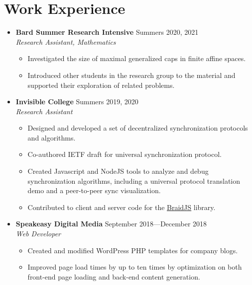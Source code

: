 \documentclass[12pt,letterpaper]{article}
\newenvironment{explist}
{\begin{itemize}[label=\textbf{--},itemsep=1pt,topsep=0pt,partopsep=0pt,parsep=0pt]}
{\end{itemize}}
\begin{document}
\section*{Work Experience} \vspace{-0.5em}
\begin{itemize}[label=,itemsep=0pt]
    \item
    \textbf{Bard Summer Research Intensive} \hfill Summers 2020, 2021\\
    \textit{Research Assistant, Mathematics}
    \begin{explist}
        \item Investigated the size of maximal generalized caps in finite affine spaces.
        \item Introduced other students in the research group to the material and supported their exploration of related problems.
    \end{explist}
	\item 
	\textbf{Invisible College} \hfill Summers 2019, 2020\\
	\textit{Research Assistant}
	\begin{explist}
		\item Designed and developed a set of decentralized synchronization protocols and algorithms.
		\item Co-authored IETF draft for universal synchronization protocol.
		\item Created Javascript and NodeJS tools to analyze and debug synchronization algorithms, including a universal protocol translation demo and a peer-to-peer sync visualization.
        \item Contributed to client and server code for the \underline{\href{https://github.com/braid-work/braidjs}{BraidJS}} library.
	\end{explist}

	\item
	\textbf{Speakeasy Digital Media} \hfill September 2018---December 2018\\
	\textit{Web Developer}
	\begin{explist}
		\item Created and modified WordPress PHP templates for company blogs.
		\item Improved page load times by up to ten times by optimization on both front-end page loading and back-end content generation.
	\end{explist}
	

\end{itemize}
\end{document}
